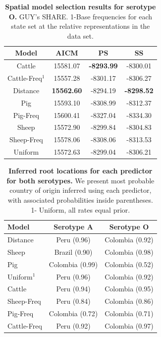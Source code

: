\documentclass[10pt]{article}
\begin{document}
\begin{table}[!ht]
\caption{
\textbf{Spatial model selection results for serotype O. } GUY's SHARE. 1-Base frequencies for each state set at the relative representations in the data set. }
\begin{center}
\begin{tabular}{cccc}
\toprule
Model	&AICM	&PS	&SS\\
\midrule
Cattle	&15581.07	&{{ \bf -8293.99}}	&-8300.01\\
Cattle-Freq$^{1}$	&15557.28	&-8301.17	&-8306.27\\ %
Distance	& {{\bf 15562.60 }}	&-8294.19	& {{ \bf -8298.52}} \\
Pig	&15593.10	&-8308.99	&-8312.37\\
Pig-Freq	&15600.41	&-8327.04	&-8334.30\\
Sheep	&15572.90	&-8299.84	&-8304.83\\
Sheep-Freq	&15578.06	&-8308.06	&-8313.53\\
Uniform	&15572.63	&-8299.04	&-8306.21\\
\bottomrule
\end{tabular}
\end{center}
\begin{flushleft}
\end{flushleft}
\label{tab:predO}
 \end{table}
\begin{table}[!ht]
\caption{
\textbf{Inferred root locations for each predictor for both serotypes.} We present most probable country of origin inferred using each predictor, with associated probabilities inside parentheses. 1- Uniform, all rates equal prior.
}
\begin{center}
\begin{tabular}{lcc}
\toprule
Model & Serotype A & Serotype O \\
\midrule
Distance & Peru (0.96)& Colombia (0.92)\\
Sheep    & Brazil (0.90) & Colombia (0.98)\\
Pig      & Colombia (0.99) &Colombia (0.52)\\
Uniform$^1$  & Peru (0.96) &Colombia (0.92)\\
Cattle   & Peru (0.94) &Colombia (0.95)\\
Sheep-Freq & Peru (0.84)&Colombia (0.86)\\
Pig-Freq & Colombia (0.72) &Colombia (0.71)\\
Cattle-Freq & Peru (0.92)& Colombia (0.97)\\
 \bottomrule
\end{tabular}
\end{center}
\begin{flushleft}
\end{flushleft}
\label{tab:roots}
 \end{table}
\end{document}
